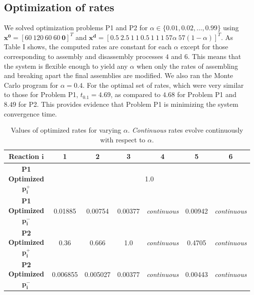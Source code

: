 \subsection{Optimization of rates} %
\label{sub:optimization_of_rates}

    We solved optimization problems P1 and P2 for $\alpha \in \{0.01, 0.02, \ldots, 0.99\}$
    using $\mathbf{x^0} = [60~120~60~60~\mathbf{0}]^T$ and $\mathbf{x^d} =
    [0.5~2.5~1~1~0.5~1~1~1~57\alpha~57(1-\alpha)]^T$.  As Table I shows,
    the computed rates are constant for each $\alpha$ except for
    those corresponding to assembly and disassembly processes $4$ and $6$.
    This means that the system is flexible enough to yield any $\alpha$
    when only the rates of assembling and breaking apart the final
    assemblies are modified.  We also ran the Monte Carlo program
    for $\alpha=0.4$.  For the optimal set of rates, which were very similar to those for
    Problem P1, $t_{0.1} = 4.69$, as compared to $4.68$ for Problem P1 and $8.49$ for P2.  This
    provides evidence that Problem P1 is minimizing the system convergence time.



    \begin{table}[t!]
        \begin{center}
        \caption{Values of optimized rates for varying $\alpha$. \textit{Continuous} rates
        evolve continuously with respect to $\alpha$.}
        \begin{tabular}{|c|c|c|c|c|c|c|}
            \hline
            \textbf{Reaction} $\mathbf{i}$ & \textbf{1} & \textbf{2} & \textbf{3} & \textbf{4} & \textbf{5} & \textbf{6} \\
            \hline
            \textbf{P1 Optimized} $\mathbf{p^+_i}$ & \multicolumn{6}{c|}{1.0} \\
            \hline
            \textbf{P1 Optimized} $\mathbf{p^-_i}$ & 0.01885 & 0.00754 & 0.00377 & \textit{continuous} & 0.00942 & \textit{continuous}\\
            \hline
            \textbf{P2 Optimized} $\mathbf{p^+_i}$ & 0.36 & 0.666 & 1.0 & \textit{continuous} & 0.4705 & \textit{continuous}\\
            \hline
            \textbf{P2 Optimized} $\mathbf{p^-_i}$ & 0.006855 & 0.005027 & 0.00377 & \textit{continuous} &  0.00443 & \textit{continuous} \\
            \hline
        \end{tabular}
        \end{center}
        \label{tab:optimized_rates}
    \end{table}

